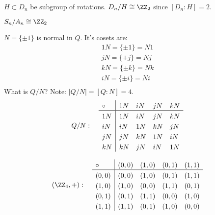 \documentclass[class=scrartcl, crop=false]{standalone}
\begin{document}
\begin{example}
  $H \subset D_n$ be subgroup of rotations. $D_n / H \cong \ZZ_2$ since $[D_n:H] = 2$.
\end{example}
\begin{example}
  $S_n / A_n \cong \ZZ_2$
\end{example}
\begin{example}
  $N = \{\pm 1\}$ is normal in $Q$. It's cosets are:
  \begin{gather*}
    1N = \{\pm 1\} = N 1 \\
    j N = \{\pm j\} = N j \\
    k N = \{\pm k\} = N k \\
    i N = \{\pm i\} = N i \\
  \end{gather*}
  What is $Q / N$? Note: $|Q / N| = [Q:N] = 4$.
  \[
      Q / N: \quad
      \setlength{\extrarowheight}{3pt}%
      \begin{array}{l|*{5}{l}}
      \circ      & 1N & iN & jN & kN \\
      \hline
      1N           & 1N & iN & jN & kN \\
      iN           & iN & 1N & kN & jN \\
      jN           & jN & kN & 1N & iN \\
      kN           & kN & jN & iN & 1N \\
      \end{array}
  \]
\end{example}
\begin{example}
  \[
      (\ZZ_4, +): \quad
      \setlength{\extrarowheight}{3pt}%
      \begin{array}{l|*{5}{l}}
        \circ      & (0,0) & (1,0) & (0,1) & (1,1) \\
      \hline
        (0,0)           & (0,0) & (1,0) & (0,1) & (1,1) \\
        (1,0)           & (1,0) & (0,0) & (1,1) & (0,1) \\
        (0,1)           & (0,1) & (1,1) & (0,0) & (1,0) \\
        (1,1)           & (1,1) & (0,1) & (1,0) & (0,0) \\
      \end{array}
  \]
    
\end{example}
\end{document}
